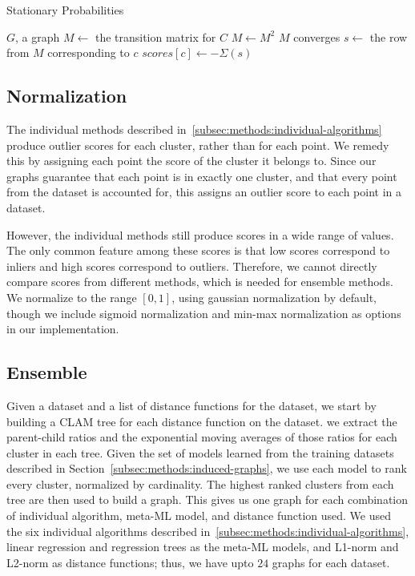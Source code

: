 \begin{algorithm}[h]
    \caption{Stationary Probabilities}
    \label{alg:sp}
\begin{algorithmic}[1]
    \REQUIRE $G$, a graph
        \STATE $M \gets$ the transition matrix for $C$
        \REPEAT
            \STATE $M \gets M^2$
        \UNTIL $M$ converges
            \STATE $s \gets $ the row from $M$ corresponding to $c$
            \STATE $scores[c] \gets -\Sigma(s)$ 
        \ENDFOR
    \ENDFOR
\end{algorithmic}
\end{algorithm}


\subsection{Normalization}
\label{subsec:methods:normalization}

The individual methods described in~\ref{subsec:methods:individual-algorithms} produce outlier scores for each cluster, rather than for each point.
We remedy this by assigning each point the score of the cluster it belongs to.
Since our graphs guarantee that each point is in exactly one cluster, and that every point from the dataset is accounted for, this assigns an outlier score to each point in a dataset.

However, the individual methods still produce scores in a wide range of values.
The only common feature among these scores is that low scores correspond to inliers and high scores correspond to outliers.
Therefore, we cannot directly compare scores from different methods, which is needed for ensemble methods.
We normalize to the range $[0, 1]$, using gaussian normalization by default, though we include sigmoid normalization and min-max normalization as options in our implementation.

\subsection{Ensemble}
\label{subsec:methods:ensemble}

Given a dataset and a list of distance functions for the dataset, we start by building a CLAM tree for each distance function on the dataset.
we extract the parent-child ratios and the exponential moving averages of those ratios for each cluster in each tree.
Given the set of models learned from the training datasets described in Section~\ref{subsec:methods:induced-graphs}, we use each model to rank every cluster, normalized by cardinality.
The highest ranked clusters from each tree are then used to build a graph.
This gives us one graph for each combination of individual algorithm, meta-ML model, and distance function used.
We used the six individual algorithms described in~\ref{subsec:methods:individual-algorithms}, linear regression and regression trees as the meta-ML models, and L1-norm and L2-norm as distance functions;
thus, we have upto $24$ graphs for each dataset.

